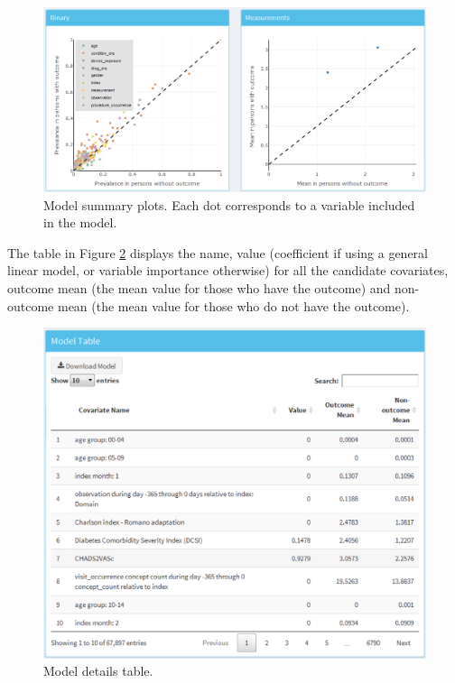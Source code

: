 \documentclass[11pt]{book}
\theoremstyle{definition}
\theoremstyle{definition}
\theoremstyle{definition}
\theoremstyle{remark}
\begin{document}
\begin{figure}

{\centering \includegraphics[width=1\linewidth]{images/PatientLevelPrediction/shiny/shinyModelPlots} 

}

\caption{Model summary plots. Each dot corresponds to a variable included in the model.}\label{fig:shinyModelPlots}
\end{figure}

The table in Figure \ref{fig:shinyModelTable} displays the name, value
(coefficient if using a general linear model, or variable importance
otherwise) for all the candidate covariates, outcome mean (the mean
value for those who have the outcome) and non-outcome mean (the mean
value for those who do not have the outcome).

\begin{figure}

{\centering \includegraphics[width=1\linewidth]{images/PatientLevelPrediction/shiny/shinyModelTable} 

}

\caption{Model details table.}\label{fig:shinyModelTable}
\end{figure}
\end{document}
